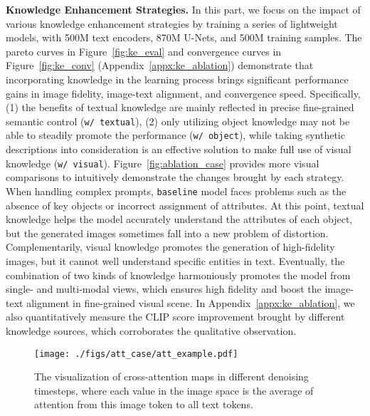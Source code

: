 \documentclass[10pt,twocolumn,letterpaper]{article}
\begin{document}
\noindent\textbf{Knowledge Enhancement Strategies.}
In this part, we focus on the impact of various knowledge enhancement strategies by training a series of lightweight models, with 500M text encoders, 870M U-Nets, and 500M training samples.
The pareto curves in Figure~\ref{fig:ke_eval} and convergence curves in Figure~\ref{fig:ke_conv} (Appendix~\ref{appx:ke_ablation}) demonstrate that incorporating knowledge in the learning process brings significant performance gains in image fidelity, image-text alignment, and convergence speed.
Specifically, (1) the benefits of textual knowledge are mainly reflected in precise fine-grained semantic control (\verb|w/ textual|), (2) only utilizing object knowledge may not be able to steadily promote the performance (\verb|w/ object|), while taking synthetic descriptions into consideration is an effective solution to make full use of visual knowledge (\verb|w/ visual|).
Figure~\ref{fig:ablation_case} provides more visual comparisons to intuitively demonstrate the changes brought by each strategy.
When handling complex prompts, \verb|baseline| model faces problems such as the absence of key objects or incorrect assignment of attributes.
At this point, textual knowledge helps the model accurately understand the attributes of each object, but the generated images sometimes fall into a new problem of distortion.
Complementarily, visual knowledge promotes the generation of high-fidelity images, but it cannot well understand specific entities in text. Eventually, the combination of two kinds of knowledge 
harmoniously promotes the model from single- and multi-modal views,
which ensures high fidelity and boost the image-text alignment in fine-grained visual scene.
In Appendix~\ref{appx:ke_ablation}, we also quantitatively measure the CLIP score improvement brought by different knowledge sources, which corroborates the qualitative observation. 



\begin{CJK*}{UTF8}{gbsn}
\begin{figure}[t]
    \centering
        \texttt{[image: ./figs/att\_case/att\_example.pdf]}
    \caption{The visualization of cross-attention maps in different denoising timesteps, where each value in the image space is the average of attention from this image token to all text tokens.}
    \label{fig:attn_vis}
\end{figure}
\end{CJK*}
\end{document}

